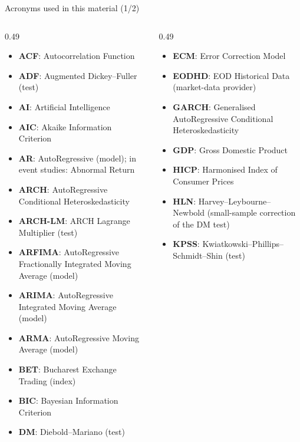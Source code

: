 \begin{frame}{Acronyms used in this material (1/2)}
\begin{columns}[T]
\begin{column}{0.49\textwidth}
\begin{itemize}\setlength{\itemsep}{0pt}
    \item \textbf{ACF}: Autocorrelation Function
    \item \textbf{ADF}: Augmented Dickey–Fuller (test)
    \item \textbf{AI}: Artificial Intelligence
    \item \textbf{AIC}: Akaike Information Criterion
    \item \textbf{AR}: AutoRegressive (model); in event studies: Abnormal Return
    \item \textbf{ARCH}: AutoRegressive Conditional Heteroskedasticity
    \item \textbf{ARCH-LM}: ARCH Lagrange Multiplier (test)
    \item \textbf{ARFIMA}: AutoRegressive Fractionally Integrated Moving Average (model)
    \item \textbf{ARIMA}: AutoRegressive Integrated Moving Average (model)
    \item \textbf{ARMA}: AutoRegressive Moving Average (model)
    \item \textbf{BET}: Bucharest Exchange Trading (index)
    \item \textbf{BIC}: Bayesian Information Criterion
    \item \textbf{DM}: Diebold–Mariano (test)
\end{itemize}
\end{column}
\begin{column}{0.49\textwidth}
\begin{itemize}\setlength{\itemsep}{0pt}
    \item \textbf{ECM}: Error Correction Model
    \item \textbf{EODHD}: EOD Historical Data (market-data provider)
    \item \textbf{GARCH}: Generalised AutoRegressive Conditional Heteroskedasticity
    \item \textbf{GDP}: Gross Domestic Product
    \item \textbf{HICP}: Harmonised Index of Consumer Prices
    \item \textbf{HLN}: Harvey–Leybourne–Newbold (small-sample correction of the DM test)
    \item \textbf{KPSS}: Kwiatkowski–Phillips–Schmidt–Shin (test)

\end{itemize}
\end{column}
\end{columns}
\end{frame}
